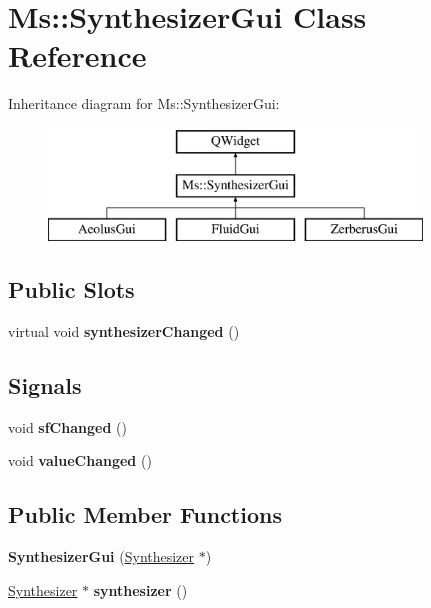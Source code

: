 \hypertarget{class_ms_1_1_synthesizer_gui}{}\section{Ms\+:\+:Synthesizer\+Gui Class Reference}
\label{class_ms_1_1_synthesizer_gui}
Inheritance diagram for Ms\+:\+:Synthesizer\+Gui\+:\begin{figure}[H]
\begin{center}
\leavevmode
\includegraphics[height=3.000000cm]{class_ms_1_1_synthesizer_gui}
\end{center}
\end{figure}
\subsection*{Public Slots}
\begin{DoxyCompactItemize}
\item 
\mbox{\label{class_ms_1_1_synthesizer_gui_a6c970fc29180243b5855acc9321f2c48}} 
virtual void {\bfseries synthesizer\+Changed} ()
\end{DoxyCompactItemize}
\subsection*{Signals}
\begin{DoxyCompactItemize}
\item 
\mbox{\label{class_ms_1_1_synthesizer_gui_a4946e935f9246de6c8f50bbe51571507}} 
void {\bfseries sf\+Changed} ()
\item 
\mbox{\label{class_ms_1_1_synthesizer_gui_a9d9bbc43b86462f75fe255e201846e42}} 
void {\bfseries value\+Changed} ()
\end{DoxyCompactItemize}
\subsection*{Public Member Functions}
\begin{DoxyCompactItemize}
\item 
\mbox{\label{class_ms_1_1_synthesizer_gui_a6355391915462ab1143017b23f431966}} 
{\bfseries Synthesizer\+Gui} (\hyperlink{class_ms_1_1_synthesizer}{Synthesizer} $\ast$)
\item 
\mbox{\label{class_ms_1_1_synthesizer_gui_a4d4687fd36933adfa80c0799aacb4dea}} 
\hyperlink{class_ms_1_1_synthesizer}{Synthesizer} $\ast$ {\bfseries synthesizer} ()
\end{DoxyCompactItemize}


